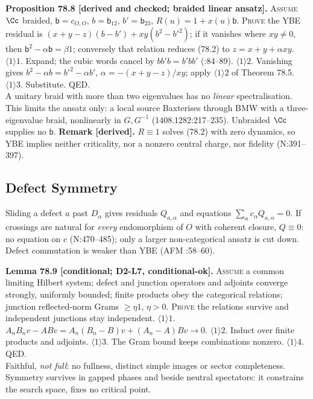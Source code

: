 \textbf{Proposition 78.8 [derived and checked; braided linear ansatz].}  \textsc{Assume} \(\Cc\)
braided, \(\mathsf b=c_{O,O}\), \(b=\mathsf b_{12}\), \(b'=\mathsf b_{23}\), \(R(u)=1+x(u)\mathsf
b\).  \textsc{Prove} the YBE residual is \((x{+}y{-}z)(b-b')+xy(b^2-b'^2)\); if it vanishes where
\(xy\neq0\), then \(\mathsf b^2-\alpha\mathsf b=\beta1\); conversely that relation reduces (78.2) to
\(z=x+y+\alpha xy\).\\ \(\langle1\rangle1\). Expand; the cubic words cancel by \(bb'b=b'bb'\)
(:84--89). \(\langle1\rangle2\). Vanishing gives \(b^2-\alpha b=b'^2-\alpha
b'\), \(\alpha=-(x{+}y{-}z)/xy\); apply \(\langle1\rangle2\) of Theorem 78.5.  \(\langle1\rangle3\).
Substitute.  QED.\\ A unitary braid with more than two eigenvalues has no \emph{linear}
spectralisation.  This limits the ansatz only: a local source Baxterises through BMW with a
three-eigenvalue braid, nonlinearly in \(G,G^{-1}\) (1408.1282:217--235).  Unbraided \(\Cc\)
supplies no \(\mathsf b\). \textbf{Remark [derived].}  \(R\equiv1\) solves (78.2) with zero
dynamics, so YBE implies neither criticality, nor a nonzero central charge, nor fidelity
(N:391--397).

\subsection{Defect Symmetry}

Sliding a defect \(a\) past \(D_\alpha\) gives residuals \(Q_{a,\alpha}\) and equations
\(\sum_\alpha c_\alpha Q_{a,\alpha}=0\).  If crossings are natural for \emph{every} endomorphism of
\(O\) with coherent closure, \(Q\equiv0\): no equation on \(c\) (N:470--485); only a larger
non-categorical ansatz is cut down.  Defect commutation is weaker than YBE (AFM :58--60).

\textbf{Lemma 78.9 [conditional; D2-L7, conditional-ok].}  \textsc{Assume} a common limiting Hilbert
system; defect and junction operators and adjoints converge strongly, uniformly bounded; finite
products obey the categorical relations; junction reflected-norm Grams \(\ge\eta1\), \(\eta>0\).
\textsc{Prove} the relations survive and independent junctions stay independent.
\(\langle1\rangle1\). \(A_nB_nv-ABv=A_n(B_n-B)v+(A_n-A)Bv\to0\). \(\langle1\rangle2\). Induct over
finite products and adjoints.  \(\langle1\rangle3\). The Gram bound keeps combinations nonzero.
\(\langle1\rangle4\). QED.\\ Faithful, \emph{not full}: no fullness, distinct simple images or
sector completeness.  Symmetry survives in gapped phases and beside neutral spectators: it
constrains the search space, fixes no critical point.

